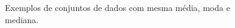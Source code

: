 \documentclass[
  letterpaper,
  DIV=11,
  numbers=noendperiod]{scrreprt}
\begin{document}
\begin{figure}

\begin{minipage}[t]{0.50\linewidth}

{\centering 


}

\end{minipage}%
%
\begin{minipage}[t]{0.50\linewidth}

{\centering 


}

\end{minipage}%

\caption{\label{fig-var}Exemplos de conjuntos de dados com mesma média,
moda e mediana.}

\end{figure}
\end{document}
